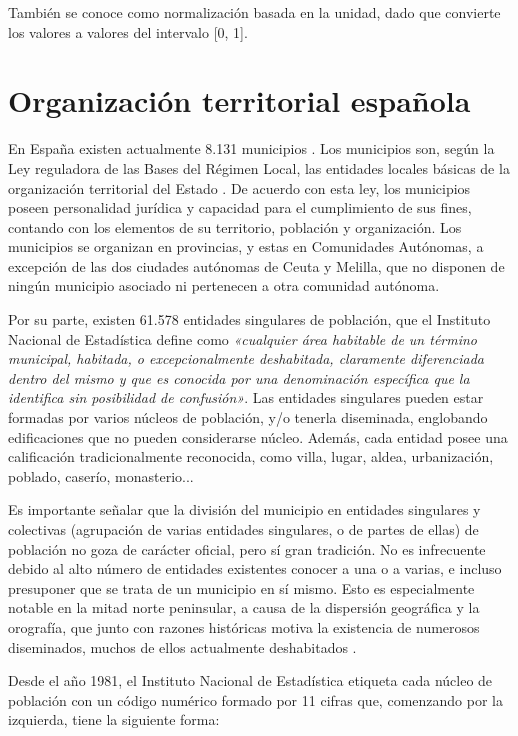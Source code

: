 También se conoce como normalización basada en la unidad, dado que convierte los valores a valores del intervalo [0, 1].

\section{Organización territorial española}

En España existen actualmente 8.131 municipios \cite{municipio}. Los municipios son, según la Ley reguladora de las Bases del Régimen Local, las entidades locales básicas de la organización territorial del Estado \cite{ESP_wiki}. De acuerdo con esta ley, los municipios poseen personalidad jurídica y capacidad para el cumplimiento de sus fines, contando con los elementos de su territorio, población y organización. Los municipios se organizan en provincias, y estas en Comunidades Autónomas, a excepción de las dos ciudades autónomas de Ceuta y Melilla, que no disponen de ningún municipio asociado ni pertenecen a otra comunidad autónoma.

Por su parte, existen 61.578 entidades singulares de población, que el Instituto Nacional de Estadística define como \textit{«cualquier área habitable de un término municipal, habitada, o excepcionalmente deshabitada, claramente diferenciada dentro del mismo y que es conocida por una denominación específica que la identifica sin posibilidad de confusión»}. Las entidades singulares pueden estar formadas por varios núcleos de población, y/o tenerla diseminada, englobando edificaciones que no pueden considerarse núcleo. Además, cada entidad posee una calificación tradicionalmente reconocida, como villa, lugar, aldea, urbanización, poblado, caserío, monasterio...

Es importante señalar que la división del municipio en entidades singulares y colectivas (agrupación de varias entidades singulares, o de partes de ellas) de población no goza de carácter oficial, pero sí gran tradición. No es infrecuente debido al alto número de entidades existentes conocer a una o a varias, e incluso presuponer que se trata de un municipio en sí mismo. Esto es especialmente notable en la mitad norte peninsular, a causa de la dispersión geográfica y la orografía, que junto con razones históricas motiva la existencia de numerosos diseminados, muchos de ellos actualmente deshabitados \cite{INE_entidad_singular}.

Desde el año 1981, el Instituto Nacional de Estadística etiqueta cada núcleo de población con un código numérico formado por 11 cifras que, comenzando por la izquierda, tiene la siguiente forma:

